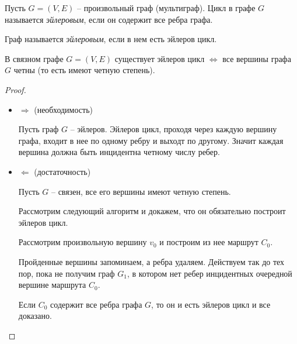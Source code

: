 \begin{definition}
    Пусть $ G = (V,E) $ -- произвольный граф (мультиграф). Цикл в графе $ G $ называется \emph{эйлеровым}, если он содержит все ребра графа.
\end{definition}

\begin{definition}
    Граф называется \emph{эйлеровым}, если в нем есть эйлеров цикл.
\end{definition}

\begin{theorem}[Эйлер, 1736]
    В связном графе $ G = (V,E) $ существует эйлеров цикл $ \iff $ все вершины графа $ G $ четны (то есть имеют четную степень).
\end{theorem}

\begin{proof}\leavevmode
    \begin{itemize}
        \item $ \boxed{\Rightarrow} $ (необходимость)

              Пусть граф $ G $ -- эйлеров. Эйлеров цикл, проходя через каждую вершину графа, входит в нее по одному ребру и выходт по другому. Значит каждая вершина должна быть инцидентна четному числу ребер.

        \item $ \boxed{\Leftarrow} $ (достаточность)

              Пусть $ G $ -- связен, все его вершины имеют четную степень.

              Рассмотрим следующий алгоритм и докажем, что он обязательно построит эйлеров цикл.

              \begin{note}
                  Рассмотрим произвольную вершину $ v_0 $ и построим из нее маршрут $ C_0 $.

                  Пройденные вершины запоминаем, а ребра удаляем. Действуем так до тех пор, пока не получим граф $ G_1 $, в котором нет ребер инцидентных очередной вершине маршрута $ C_0 $.
                  \begin{figure}[H]
                      \centering
                      \label{fig:fig_09}
                  \end{figure}

                  Если $ C_0 $ содержит все ребра графа $ G $, то он и есть эйлеров цикл и все доказано.


\end{note}
\end{itemize}
\end{proof}
